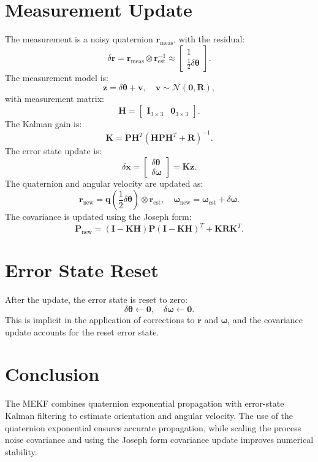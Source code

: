 \documentclass[a4paper,10pt]{article}
\begin{document}
\section{Measurement Update}
The measurement is a noisy quaternion $\mathbf{r}_{\text{meas}}$, with the residual:
\[
\delta \mathbf{r} = \mathbf{r}_{\text{meas}} \otimes \mathbf{r}_{\text{est}}^{-1} \approx \begin{bmatrix} 1 \\ \frac{1}{2} \delta \boldsymbol{\theta} \end{bmatrix}.
\]
The measurement model is:
\[
\mathbf{z} = \delta \boldsymbol{\theta} + \mathbf{v}, \quad \mathbf{v} \sim \mathcal{N}(\mathbf{0}, \mathbf{R}),
\]
with measurement matrix:
\[
\mathbf{H} = \begin{bmatrix} \mathbf{I}_{3 \times 3} & \mathbf{0}_{3 \times 3} \end{bmatrix}.
\]
The Kalman gain is:
\[
\mathbf{K} = \mathbf{P} \mathbf{H}^T (\mathbf{H} \mathbf{P} \mathbf{H}^T + \mathbf{R})^{-1}.
\]
The error state update is:
\[
\delta \mathbf{x} = \begin{bmatrix} \delta \boldsymbol{\theta} \\ \delta \boldsymbol{\omega} \end{bmatrix} = \mathbf{K} \mathbf{z}.
\]
The quaternion and angular velocity are updated as:
\[
\mathbf{r}_{\text{new}} = \mathbf{q}\left( \frac{1}{2} \delta \boldsymbol{\theta} \right) \otimes \mathbf{r}_{\text{est}}, \quad \boldsymbol{\omega}_{\text{new}} = \boldsymbol{\omega}_{\text{est}} + \delta \boldsymbol{\omega}.
\]
The covariance is updated using the Joseph form:
\[
\mathbf{P}_{\text{new}} = (\mathbf{I} - \mathbf{K} \mathbf{H}) \mathbf{P} (\mathbf{I} - \mathbf{K} \mathbf{H})^T + \mathbf{K} \mathbf{R} \mathbf{K}^T.
\]

\section{Error State Reset}
After the update, the error state is reset to zero:
\[
\delta \boldsymbol{\theta} \gets \mathbf{0}, \quad \delta \boldsymbol{\omega} \gets \mathbf{0}.
\]
This is implicit in the application of corrections to $\mathbf{r}$ and $\boldsymbol{\omega}$, and the covariance update accounts for the reset error state.

\section{Conclusion}
The MEKF combines quaternion exponential propagation with error-state Kalman filtering to estimate orientation and angular velocity. The use of the quaternion exponential ensures accurate propagation, while scaling the process noise covariance and using the Joseph form covariance update improves numerical stability.
\end{document}
